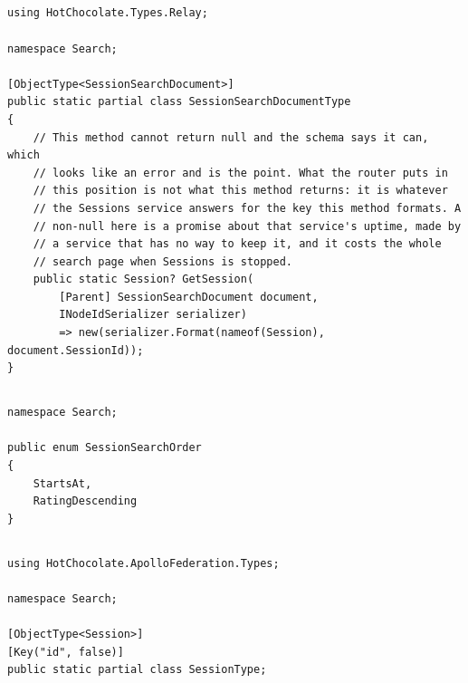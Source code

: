 \subsection*{}
\begin{verbatim}
using HotChocolate.Types.Relay;

namespace Search;

[ObjectType<SessionSearchDocument>]
public static partial class SessionSearchDocumentType
{
    // This method cannot return null and the schema says it can, which
    // looks like an error and is the point. What the router puts in
    // this position is not what this method returns: it is whatever
    // the Sessions service answers for the key this method formats. A
    // non-null here is a promise about that service's uptime, made by
    // a service that has no way to keep it, and it costs the whole
    // search page when Sessions is stopped.
    public static Session? GetSession(
        [Parent] SessionSearchDocument document,
        INodeIdSerializer serializer)
        => new(serializer.Format(nameof(Session), document.SessionId));
}
\end{verbatim}

\subsection*{}
\begin{verbatim}
namespace Search;

public enum SessionSearchOrder
{
    StartsAt,
    RatingDescending
}
\end{verbatim}

\subsection*{}
\begin{verbatim}
using HotChocolate.ApolloFederation.Types;

namespace Search;

[ObjectType<Session>]
[Key("id", false)]
public static partial class SessionType;
\end{verbatim}

